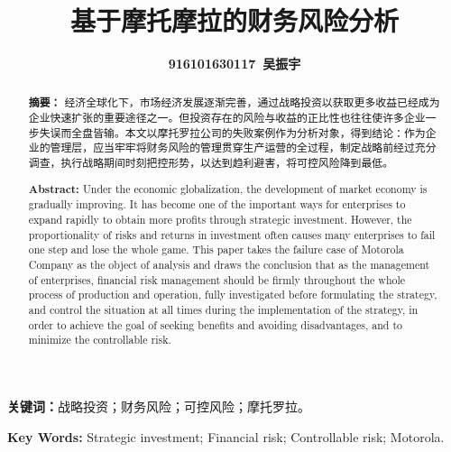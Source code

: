 \documentclass{ctexart}
\begin{document}
\title{\heiti{}\textbf{基于摩托摩拉的财务风险分析}}
\author{\kaishu{}\textbf{916101630117~吴振宇} }
\date{}
\maketitle

{
	\setlength{\baselineskip}{18pt}
	\kaishu

	\renewcommand{\abstractname}{}
	\begin{abstract}
		\noindent
		\textbf{摘要：} 经济全球化下，市场经济发展逐渐完善，通过战略投资以获取更多收益已经成为企业快速扩张的重要途径之一。但投资存在的风险与收益的正比性也往往使许多企业一步失误而全盘皆输。本文以摩托罗拉公司的失败案例作为分析对象，得到结论：作为企业的管理层，应当牢牢将财务风险的管理贯穿生产运营的全过程，制定战略前经过充分调查，执行战略期间时刻把控形势，以达到趋利避害，将可控风险降到最低。
	\end{abstract}

	\textbf{关键词：}战略投资；财务风险；可控风险；摩托罗拉。

	\renewcommand{\abstractname}{}
	\begin{abstract}
		\noindent
		\textbf{Abstract: }Under the economic globalization, the development of market economy is gradually improving. It has become one of the important ways for enterprises to expand rapidly to obtain more profits through strategic investment. However, the proportionality of risks and returns in investment often causes many enterprises to fail one step and lose the whole game. This paper takes the failure case of Motorola Company as the object of analysis and draws the conclusion that as the management of enterprises, financial risk management should be firmly throughout the whole process of production and operation, fully investigated before formulating the strategy, and control the situation at all times during the implementation of the strategy, in order to achieve the goal of seeking benefits and avoiding disadvantages, and to minimize the controllable risk.
	\end{abstract}

	\textbf{Key Words: }Strategic investment; Financial risk; Controllable risk; Motorola.

}

\pagestyle{fancy}
\lfoot{\small{\leftmark}}
\rfoot{\small{\rightmark}}

\setcounter{page}{1}
\end{document}
